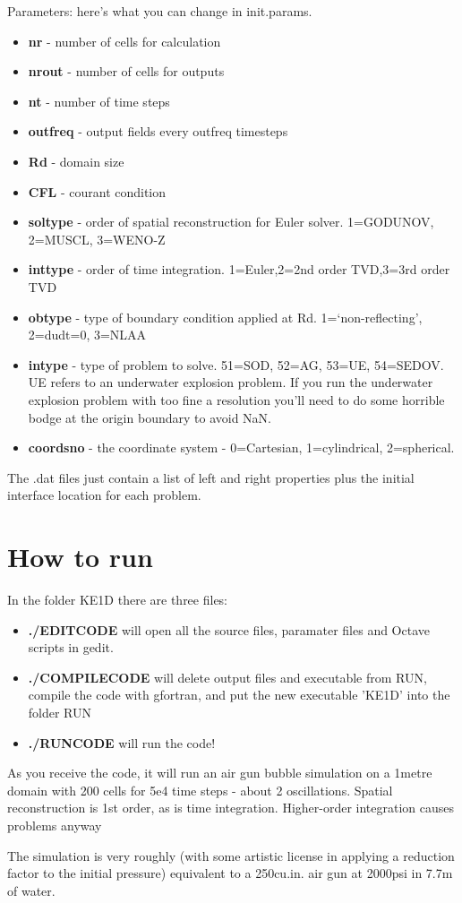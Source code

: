 \documentclass{article}
\begin{document}
Parameters: here's what you can change in init.params.
\begin{itemize}
\item \textbf{nr} - number of cells for calculation
\item \textbf{nrout} - number of cells for outputs
\item \textbf{nt} - number of time steps
\item \textbf{outfreq} - output fields every outfreq timesteps
\item \textbf{Rd} - domain size
\item \textbf{CFL} - courant condition
\item \textbf{soltype} - order of spatial reconstruction for Euler solver. 1=GODUNOV, 2=MUSCL, 3=WENO-Z
\item \textbf{inttype} - order of time integration. 1=Euler,2=2nd order TVD,3=3rd order TVD
\item \textbf{obtype} - type of boundary condition applied at Rd. 1=`non-reflecting', 2=dudt=0, 3=NLAA
\item \textbf{intype} - type of problem to solve. 51=SOD, 52=AG, 53=UE, 54=SEDOV. UE refers to an underwater explosion problem. If you run the underwater explosion problem with too fine a resolution you'll need to do some horrible bodge at the origin boundary to avoid NaN.
\item \textbf{coordsno} - the coordinate system - 0=Cartesian, 1=cylindrical, 2=spherical.
\end{itemize}

The .dat files just contain a list of left and right properties plus the initial interface location for each problem.

\section{How to run}
In the folder KE1D there are three files:

\begin{itemize}
\item \textbf{./EDITCODE} will open all the source files, paramater files and Octave scripts in gedit.
\item \textbf{./COMPILECODE} will delete output files and executable from RUN, compile the code with gfortran, and put the new executable 'KE1D' into the folder RUN
\item \textbf{./RUNCODE} will run the code!
\end{itemize}

As you receive the code, it will run an air gun bubble simulation on a 1metre domain with 200 cells for 5e4 time steps - about 2 oscillations. Spatial reconstruction is 1st order, as is time integration. Higher-order integration causes problems anyway

The simulation is very roughly (with some artistic license in applying a reduction factor to the initial pressure) equivalent to a 250cu.in.
air gun at 2000psi in 7.7m of water.
\end{document}
